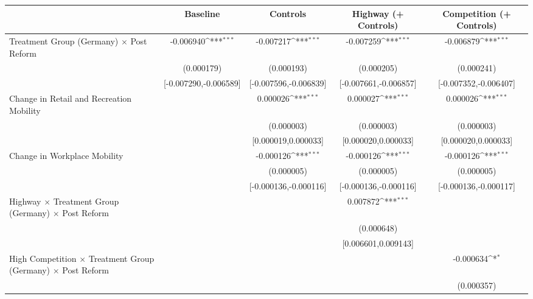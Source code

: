 {
\def\sym#1{\ifmmode^{#1}\else\(^{#1}\)\fi}
\begin{tabular}{l*{4}{c}}
\toprule
                    &\multicolumn{1}{c}{Baseline}&\multicolumn{1}{c}{Controls}&\multicolumn{1}{c}{Highway (+ Controls)}&\multicolumn{1}{c}{Competition (+ Controls)}\\
\midrule
Treatment Group (Germany) $\times$ Post Reform&   -0.006940\sym{***}&   -0.007217\sym{***}&   -0.007259\sym{***}&   -0.006879\sym{***}\\
                    &  (0.000179)         &  (0.000193)         &  (0.000205)         &  (0.000241)         \\
                    &[-0.007290,-0.006589]         &[-0.007596,-0.006839]         &[-0.007661,-0.006857]         &[-0.007352,-0.006407]         \\
Change in Retail and Recreation Mobility&                     &    0.000026\sym{***}&    0.000027\sym{***}&    0.000026\sym{***}\\
                    &                     &  (0.000003)         &  (0.000003)         &  (0.000003)         \\
                    &                     &[0.000019,0.000033]         &[0.000020,0.000033]         &[0.000020,0.000033]         \\
Change in Workplace Mobility&                     &   -0.000126\sym{***}&   -0.000126\sym{***}&   -0.000126\sym{***}\\
                    &                     &  (0.000005)         &  (0.000005)         &  (0.000005)         \\
                    &                     &[-0.000136,-0.000116]         &[-0.000136,-0.000116]         &[-0.000136,-0.000117]         \\
Highway $\times$ Treatment Group (Germany) $\times$ Post Reform&                     &                     &    0.007872\sym{***}&                     \\
                    &                     &                     &  (0.000648)         &                     \\
                    &                     &                     &[0.006601,0.009143]         &                     \\
High Competition $\times$ Treatment Group (Germany) $\times$ Post Reform&                     &                     &                     &   -0.000634\sym{*}  \\
                    &                     &                     &                     &  (0.000357)         \\

\end{tabular}}
